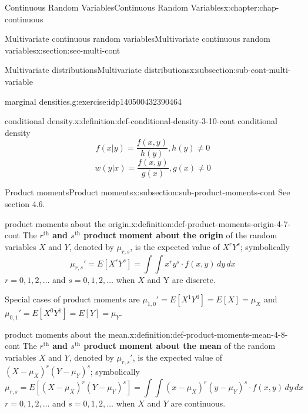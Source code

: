\documentclass[oneside,10pt,]{book}
\newcommand{\terminology}[1]{\textbf{#1}}
\begin{document}
\begin{chapterptx}{Continuous Random Variables}{}{Continuous Random Variables}{}{}{x:chapter:chap-continuous}
\begin{sectionptx}{Multivariate continuous random variables}{}{Multivariate continuous random variables}{}{}{x:section:sec-multi-cont}
\begin{subsectionptx}{Multivariate distributions}{}{Multivariate distributions}{}{}{x:subsection:sub-cont-multi-variable}
\begin{inlineexercise}{marginal densities.}{g:exercise:idp140500432390464}
\end{inlineexercise}
\begin{definition}{conditional density.}{x:definition:def-conditional-density-3-10-cont}%
conditional density%
\begin{equation*}
f(x|y) = \dfrac{f(x, y)}{h(y)}, h(y)\ne 0
\end{equation*}
%
\begin{equation*}
w(y|x) = \dfrac{f(x, y)}{g(x)}, g(x)\ne 0
\end{equation*}
%
\end{definition}
\end{subsectionptx}
%
%
\typeout{************************************************}
\typeout{************************************************}
%
\begin{subsectionptx}{Product moments}{}{Product moments}{}{}{x:subsection:sub-product-moments-cont}
See section 4.6.%
\begin{definition}{product moments about the origin.}{x:definition:def-product-moments-origin-4-7-cont}%
The \terminology{\(\displaystyle r^\text{th}\) and \(\displaystyle
s^\text{th}\) product moment about the origin} of the random variables \(X\) and \(Y\), denoted by \(\displaystyle \mu_{r,s}\), is the expected value of \(\displaystyle X^rY^s\); symbolically%
\begin{equation*}
\mu_{r,s}'=E[X^rY^s] = \int\int x^r y^s\cdot f(x, y)\,dy\,dx
\end{equation*}
\(\displaystyle r = 0,1,2, \dots\) and \(\displaystyle s = 0,1,2,
\dots\) when \(X\) and Y are discrete.%
\end{definition}
Special cases of product moments are \(\displaystyle \mu_{1,0}' =
E[X^1Y^0] = E[X] = \mu_X\) and \(\displaystyle \mu_{0,1}' = E[X^0Y^1]
= E[Y] = \mu_Y\).%
\begin{definition}{product moments about the mean.}{x:definition:def-product-moments-mean-4-8-cont}%
The \terminology{\(\displaystyle r^\text{th}\) and \(\displaystyle
s^\text{th}\) product moment about the mean} of the random variables \(X\) and \(Y\), denoted by \(\displaystyle \mu_{r,s}'\), is the expected value of \(\displaystyle (X-\mu_X)^r(Y-\mu_Y)^s\); symbolically%
\begin{equation*}
\mu_{r,s}=E[(X-\mu_X)^r(Y-\mu_Y)^s] = \int\int (x-\mu_X)^r
(y-\mu_Y)^s\cdot f(x, y)\,dy\,dx
\end{equation*}
\(\displaystyle r = 0,1,2, \dots\) and \(\displaystyle s = 0,1,2, \dots\) when \(X\) and \(Y\) are continuous.%

\end{definition}
\end{subsectionptx}
\end{sectionptx}
\end{chapterptx}
\end{document}
